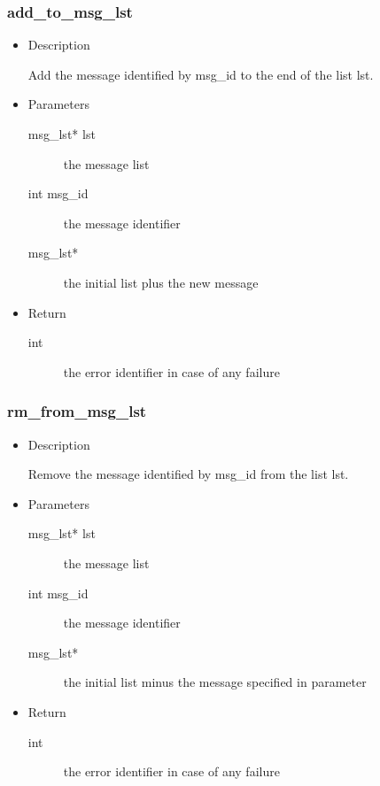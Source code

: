 \subsubsection{add\_to\_msg\_lst}
\begin{itemize}
\item{Description}

	Add the message identified by msg\_id to the end of the list lst.
\item{Parameters}
	\begin{description}
	\item[msg\_lst* lst] the message list
	\item[int msg\_id] the message identifier
	\item[msg\_lst*] the initial list plus the new message
	\end{description}
\item{Return}
	\begin{description}
	\item[int] the error identifier in case of any failure
	\end{description}
\end{itemize}

\subsubsection{rm\_from\_msg\_lst}
\begin{itemize}
\item{Description}

	Remove the message identified by msg\_id from the list lst.
\item{Parameters}
	\begin{description}
	\item[msg\_lst* lst] the message list
	\item[int msg\_id] the message identifier
	\item[msg\_lst*] the initial list minus the message specified in parameter
	\end{description}
\item{Return}
	\begin{description}
	\item[int] the error identifier in case of any failure
	\end{description}
\end{itemize}

